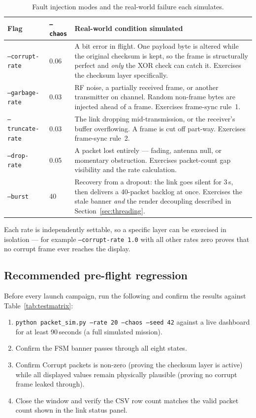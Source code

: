 \documentclass[11pt,a4paper]{article}
\newcommand{\code}[1]{\texttt{#1}}
\begin{document}
\begin{table}[htbp]
\centering
\caption{Fault injection modes and the real-world failure each simulates.}
\label{tab:faults}
\small
\begin{tabularx}{\textwidth}{@{}llX@{}}
\toprule
\textbf{Flag} & \textbf{\code{--chaos}} & \textbf{Real-world condition simulated}\\
\midrule
\code{--corrupt-rate}  & 0.06 & A bit error in flight. One payload byte is altered while the original checksum is kept, so the frame is structurally perfect and \emph{only} the XOR check can catch it. Exercises the checksum layer specifically.\\
\code{--garbage-rate}  & 0.03 & RF noise, a partially received frame, or another transmitter on channel. Random non-frame bytes are injected ahead of a frame. Exercises frame-sync rule~1.\\
\code{--truncate-rate} & 0.03 & The link dropping mid-transmission, or the receiver's buffer overflowing. A frame is cut off part-way. Exercises frame-sync rule~2.\\
\code{--drop-rate}     & 0.05 & A packet lost entirely --- fading, antenna null, or momentary obstruction. Exercises packet-count gap visibility and the rate calculation.\\
\code{--burst}         & 40   & Recovery from a dropout: the link goes silent for 3\,s, then delivers a 40-packet backlog at once. Exercises the stale banner \emph{and} the render decoupling described in Section~\ref{sec:threading}.\\
\bottomrule
\end{tabularx}
\end{table}

Each rate is independently settable, so a specific layer can be exercised in
isolation --- for example \code{--corrupt-rate 1.0} with all other rates zero
proves that no corrupt frame ever reaches the display.

\subsection{Recommended pre-flight regression}

Before every launch campaign, run the following and confirm the results
against Table~\ref{tab:testmatrix}:

\begin{enumerate}
  \item \code{python packet\_sim.py --rate 20 --chaos --seed 42} against a
        live dashboard for at least 90\,seconds (a full simulated mission).
  \item Confirm the FSM banner passes through all eight states.
  \item Confirm \textsf{Corrupt packets} is non-zero (proving the checksum
        layer is active) while all displayed values remain physically
        plausible (proving no corrupt frame leaked through).
  \item Close the window and verify the CSV row count matches the valid
        packet count shown in the link status panel.
\end{enumerate}
\end{document}
